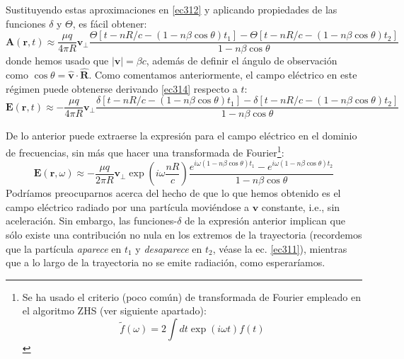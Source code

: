 \documentclass[12 pt, a4paper]{article} %
\numberwithin{equation}{section}
\numberwithin{figure}{section}
\newcommand{\vect}[1]{\boldsymbol{\mathbf{#1}}}
\begin{document}
Sustituyendo estas aproximaciones en \eqref{ec312} y aplicando propiedades de las funciones $\delta$ y $\Theta$, es fácil obtener:
\begin{equation}
	\vect{A}\left(\vect{r}, t\right)\approx\frac{\mu q}{4\pi R}\vect{v}_\perp\frac{\Theta\left[t-nR/c-\left(1-n\beta\cos{\theta}\right)t_1\right]-\Theta\left[t-nR/c-\left(1-n\beta\cos{\theta}\right)t_2\right]}{1-n\beta\cos{\theta}}\label{ec314}
\end{equation}
donde hemos usado que $\left|\vect{v}\right|=\beta c$, además de definir el ángulo de observación como $\cos{\theta}=\hat{\vect{v}}\cdot\hat{\vect{R}}$. Como comentamos anteriormente, el campo eléctrico en este régimen puede obtenerse derivando \eqref{ec314} respecto a $t$:
\begin{equation}
	\vect{E}\left(\vect{r}, t\right)\approx-\frac{\mu q}{4\pi R}\vect{v}_\perp\frac{\delta\left[t-nR/c-\left(1-n\beta\cos{\theta}\right)t_1\right]-\delta\left[t-nR/c-\left(1-n\beta\cos{\theta}\right)t_2\right]}{1-n\beta\cos{\theta}}\label{ec315}
\end{equation}

De lo anterior puede extraerse la expresión para el campo eléctrico en el dominio de frecuencias, sin más que hacer una transformada de Fourier\footnote{ Se ha usado el criterio (poco común) de transformada de Fourier empleado en el algoritmo ZHS (ver siguiente apartado):
	$$\tilde{f}(\omega)=2\int dt \exp\left(i\omega t\right)f(t)$$}:
\begin{equation}
	\vect{E}\left(\vect{r}, \omega\right)\approx-\frac{\mu q}{2\pi R}\vect{v}_\perp \exp\left(i\omega\frac{nR}{c}\right)\frac{e^{i\omega(1-n\beta\cos{\theta})t_1}-e^{i\omega(1-n\beta\cos{\theta})t_2}}{1-n\beta\cos{\theta}}\label{ec316}
\end{equation}
Podríamos preocuparnos acerca del hecho de que lo que hemos obtenido es el campo eléctrico radiado por una partícula moviéndose a $\vect{v}$ constante, i.e., sin aceleración. Sin embargo, las funciones-$\delta$ de la expresión anterior implican que sólo existe una contribución no nula en los extremos de la trayectoria (recordemos que la partícula \textit{aparece} en $t_1$ y \textit{desaparece} en $t_2$, véase la ec. \ref{ec311}), mientras que a lo largo de la trayectoria no se emite radiación, como esperaríamos.
\end{document}
